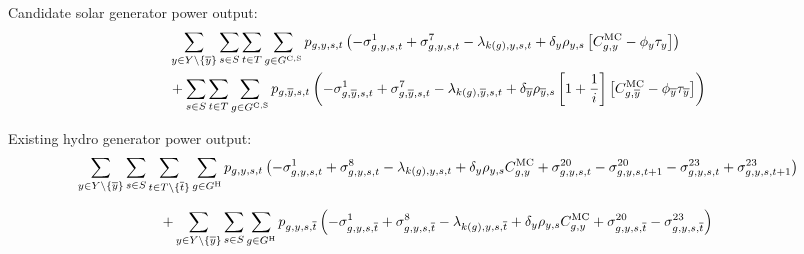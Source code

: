 \documentclass{article}
\begin{document}
Candidate solar generator power output:
\begin{align}
	& \sum\limits_{\iYear \in \sYears 
		\setminus \{\iYearTerminal\}
	}\sum\limits_{\iScenario \in \sScenarios}\sum\limits_{\iInterval \in \sIntervals} \sum\limits_{\iGenerator \in \sGeneratorsCandidateSolar} \vPower \left(-\dMinPowerOutput + \dMaxPowerOutputSolarCandidate 
	- \dPowerBalance[k(\iGenerator),\iYear,\iScenario,\iInterval] + \cDiscountRate \cScenarioDuration \left[\cMarginalCost - \vBaseline\vPermitPrice \right]
	\right) \nonumber\\
	& + \sum\limits_{\iScenario \in \sScenarios} \sum\limits_{\iInterval \in \sIntervals} \sum\limits_{\iGenerator \in \sGeneratorsCandidateSolar} \vPower[\iGenerator,\iYearTerminal,\iScenario,\iInterval] \left(-\dMinPowerOutput[\iGenerator,\iYearTerminal,\iScenario,\iInterval] + \dMaxPowerOutputSolarCandidate[\iGenerator,\iYearTerminal,\iScenario,\iInterval] - \dPowerBalance[k(\iGenerator),\iYearTerminal,\iScenario,\iInterval] + \cDiscountRate[\iYearTerminal] \cScenarioDuration[\iYearTerminal,\iScenario] \left[1 + \frac{1}{\cInterestRate}\right] \left[\cMarginalCost[\iGenerator,\iYearTerminal] - \vBaseline[\iYearTerminal]\vPermitPrice[\iYearTerminal] \right] \right)\nonumber\\
\end{align}

Existing hydro generator power output:
\begin{equation}
\sum\limits_{\iYear \in \sYears \setminus \{\iYearTerminal\}}\sum\limits_{\iScenario \in \sScenarios} \sum\limits_{\iInterval \in \sIntervals \setminus \{\iIntervalTerminal\}} \sum\limits_{\iGenerator \in \sGeneratorsHydro} \vPower\left(-\dMinPowerOutput + \dMaxPowerOutputHydro - \dPowerBalance[k(\iGenerator),\iYear,\iScenario,\iInterval] + \cDiscountRate \cScenarioDuration\cMarginalCost + \dRampRateUp - \dRampRateUp[\iGenerator,\iYear,\iScenario,\iInterval + 1] - \dRampRateDown + \dRampRateDown[\iGenerator,\iYear,\iScenario,\iInterval + 1]
\right)
\end{equation}

\begin{equation}
+ \sum\limits_{\iYear \in \sYears \setminus \{\iYearTerminal\}}\sum\limits_{\iScenario \in \sScenarios} \sum\limits_{\iGenerator \in \sGeneratorsHydro} \vPower[\iGenerator,\iYear,\iScenario,\iIntervalTerminal]\left(-\dMinPowerOutput[\iGenerator,\iYear,\iScenario,\iIntervalTerminal] + \dMaxPowerOutputHydro[\iGenerator,\iYear,\iScenario,\iIntervalTerminal] - \dPowerBalance[k(\iGenerator),\iYear,\iScenario,\iIntervalTerminal] + \cDiscountRate \cScenarioDuration \cMarginalCost + \dRampRateUp[\iGenerator,\iYear,\iScenario,\iIntervalTerminal] - \dRampRateDown[\iGenerator,\iYear,\iScenario,\iIntervalTerminal]
\right)
\end{equation}
\end{document}
